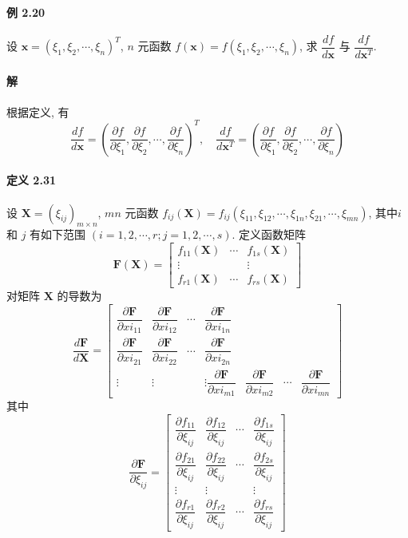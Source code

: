 \paragraph*{例 2.20} 设 $\bm{x} = (\xi_1, \xi_2, \cdots, \xi_n)^T$, $n$ 元函数 $f(\bm{x}) = f(\xi_1, \xi_2, \cdots, \xi_n)$, 求 $\dfrac{df}{d\bm{x}}$ 与 $\dfrac{df}{d\bm{x}^T}$.

\paragraph*{解} 根据定义, 有
$$
    \dfrac{df}{d\bm{x}} = (\dfrac{\partial f}{\partial \xi_1}, \dfrac{\partial f}{\partial \xi_2}, \cdots, \dfrac{\partial f}{\partial \xi_n})^T, \quad \dfrac{df}{d\bm{x}^T} = (\dfrac{\partial f}{\partial \xi_1}, \dfrac{\partial f}{\partial \xi_2}, \cdots, \dfrac{\partial f}{\partial \xi_n})
$$

\paragraph*{定义 2.31} 设 $\bm{X} = (\xi_{ij})_{m\times n}$, $mn$ 元函数 $f_{ij}(\bm{X}) = f_{ij}(\xi_{11}, \xi_{12}, \cdots, \xi_{1n}, \xi_{21}, \cdots, \xi_{mn})$, 其中$i$ 和
$j$ 有如下范围 $(i = 1,2,\cdots, r; j = 1,2,\cdots,s)$. 定义函数矩阵
$$
    \bm{F}(\bm{X}) = \begin{bmatrix}
        f_{11}(\bm{X}) & \cdots & f_{1s}(\bm{X}) \\
        \vdots & & \vdots \\
        f_{r1}(\bm{X}) & \cdots & f_{rs}(\bm{X})
    \end{bmatrix}
$$
对矩阵 $\bm{X}$ 的导数为
$$
\dfrac{d \bm{F}}{d \bm{X}} = \begin{bmatrix}
    \dfrac{\partial \bm{F}}{\partial xi_{11}} & \dfrac{\partial \bm{F}}{\partial xi_{12}} & \cdots & \dfrac{\partial \bm{F}}{\partial xi_{1n}} \\
    \dfrac{\partial \bm{F}}{\partial xi_{21}} & \dfrac{\partial \bm{F}}{\partial xi_{22}} & \cdots & \dfrac{\partial \bm{F}}{\partial xi_{2n}} \\
    \vdots                                    & \vdots                                    &        & \vdots
    \dfrac{\partial \bm{F}}{\partial xi_{m1}} & \dfrac{\partial \bm{F}}{\partial xi_{m2}} & \cdots & \dfrac{\partial \bm{F}}{\partial xi_{mn}}
\end{bmatrix}
$$
其中
$$
    \dfrac{\partial \bm{F}}{\partial \xi_{ij}} = \begin{bmatrix}
        \dfrac{\partial f_{11}}{\partial\xi_{ij}} & \dfrac{\partial f_{12}}{\partial \xi_{ij}} & \cdots & \dfrac{\partial f_{1s}}{\partial\xi_{ij}} \\
        \dfrac{\partial f_{21}}{\partial\xi_{ij}} & \dfrac{\partial f_{22}}{\partial \xi_{ij}} & \cdots & \dfrac{\partial f_{2s}}{\partial\xi_{ij}} \\
        \vdots                                    & \vdots                                     &        & \vdots                                    \\
        \dfrac{\partial f_{r1}}{\partial\xi_{ij}} & \dfrac{\partial f_{r2}}{\partial \xi_{ij}} & \cdots & \dfrac{\partial f_{rs}}{\partial\xi_{ij}}
    \end{bmatrix}
$$

